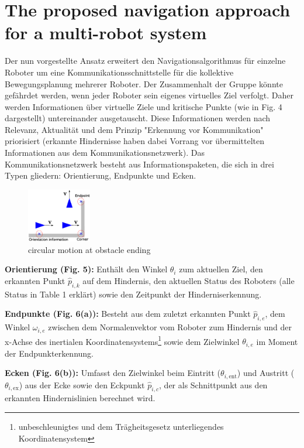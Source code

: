 \documentclass[conference]{IEEEtran}
\begin{document}
\section{The proposed navigation approach for a multi-robot system}
Der nun vorgestellte Ansatz erweitert den Navigationsalgorithmus für einzelne Roboter 
um eine Kommunikationsschnittstelle für die kollektive Bewegungsplanung mehrerer 
Roboter. Der Zusammenhalt der Gruppe könnte gefährdet werden, wenn jeder Roboter 
sein eigenes virtuelles Ziel verfolgt. Daher werden Informationen über virtuelle 
Ziele und kritische Punkte (wie in Fig. 4 dargestellt) untereinander ausgetauscht. 
Diese Informationen werden nach Relevanz, Aktualität und dem Prinzip "Erkennung vor 
Kommunikation" priorisiert (erkannte Hindernisse haben dabei Vorrang vor übermittelten 
Informationen aus dem Kommunikationsnetzwerk).
Das Kommunikationsnetzwerk besteht aus Informationspaketen, die sich in drei Typen 
gliedern: Orientierung, Endpunkte und Ecken.

\begin{figure}[h]
    \centering
    \includegraphics[width=0.25\textwidth]{Pictures/critical points.png}
    \caption{circular motion at obstacle ending}
    \label{fig:bild-unterordner}
\end{figure}

\textbf{Orientierung (Fig. 5):} Enthält den Winkel \( \theta_i \) zum aktuellen Ziel, den erkannten 
Punkt \( \hat{p}_{i,k} \) auf dem Hindernis, den aktuellen Status des Roboters (alle Status in Table 1 erklärt) sowie den 
Zeitpunkt der Hinderniserkennung.

\textbf{Endpunkte (Fig. 6(a)):} Besteht aus dem zuletzt erkannten Punkt \( \hat{p}_{i,e} \), dem Winkel \( \omega_{i,e} \) 
zwischen dem Normalenvektor vom Roboter zum Hindernis und der x-Achse des inertialen 
Koordinatensystems\footnote{unbeschleunigtes und dem Trägheitsgesetz unterliegendes Koordinatensystem} sowie 
dem Zielwinkel \( \theta_{i,e} \) im Moment der Endpunkterkennung.

\textbf{Ecken (Fig. 6(b)):} Umfasst den Zielwinkel beim Eintritt (\( \theta_{i,\mathrm{ent}} \)) und Austritt 
(\( \theta_{i,\mathrm{ex}} \)) aus der Ecke sowie den Eckpunkt \( \hat{p}_{i,c} \), der als Schnittpunkt aus den
erkannten Hindernislinien berechnet wird.
\end{document}
